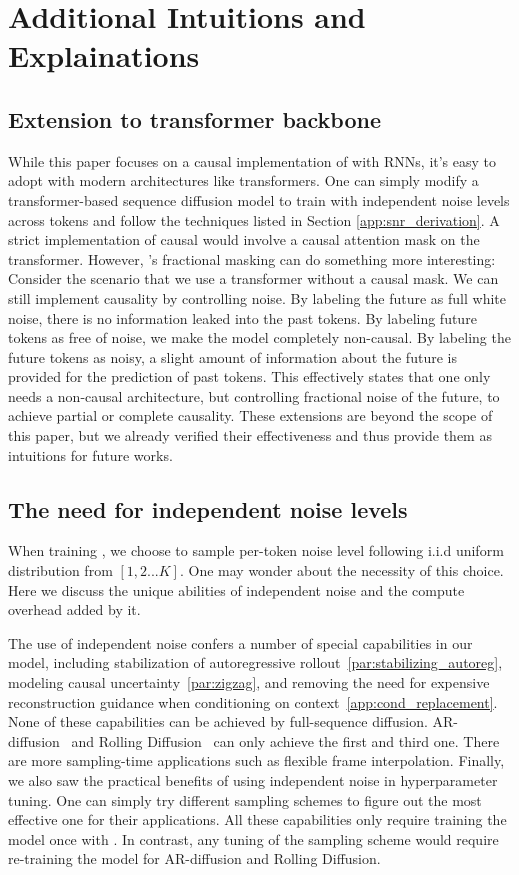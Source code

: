 \label{app:intuition}
\section{Additional Intuitions and Explainations}
\subsection{Extension to transformer backbone}
\label{app:transformer}
While this paper focuses on a causal implementation of \algo{} with RNNs, it's easy to adopt \algo{} with modern architectures like transformers. One can simply modify a transformer-based sequence diffusion model to train with independent noise levels across tokens and follow the techniques listed in Section \ref{app:snr_derivation}. A strict implementation of causal \algo{} would involve a causal attention mask on the transformer. However, \algo's fractional masking can do something more interesting: Consider the scenario that we use a transformer without a causal mask. We can still implement causality by controlling noise. By labeling the future as full white noise, there is no information leaked into the past tokens. By labeling future tokens as free of noise, we make the model completely non-causal. By labeling the future tokens as noisy, a slight amount of information about the future is provided for the prediction of past tokens. This effectively states that one only needs a non-causal architecture, but controlling fractional noise of the future, to achieve partial or complete causality. These extensions are beyond the scope of this paper, but we already verified their effectiveness and thus provide them as intuitions for future works.

\subsection{The need for independent noise levels}
\label{app:independent_noise}
When training \algo{}, we choose to sample per-token noise level following i.i.d uniform distribution from $[1,2...K]$. One may wonder about the necessity of this choice. Here we discuss the unique abilities of independent noise and the compute overhead added by it. 

The use of independent noise confers a number of special capabilities in our model, including stabilization of autoregressive rollout~\ref{par:stabilizing_autoreg}, modeling causal uncertainty~\ref{par:zigzag}, and removing the need for expensive reconstruction guidance when conditioning on context~\ref{app:cond_replacement}. None of these capabilities can be achieved by full-sequence diffusion. AR-diffusion~\cite{wu2023ar} and Rolling Diffusion~\cite{ruhe2024rolling} can only achieve the first and third one. There are more sampling-time applications such as flexible frame interpolation. Finally, we also saw the practical benefits of using independent noise in hyperparameter tuning. One can simply try different sampling schemes to figure out the most effective one for their applications. All these capabilities only require training the model once with \algo{}. In contrast, any tuning of the sampling scheme would require re-training the model for AR-diffusion and Rolling Diffusion.  

